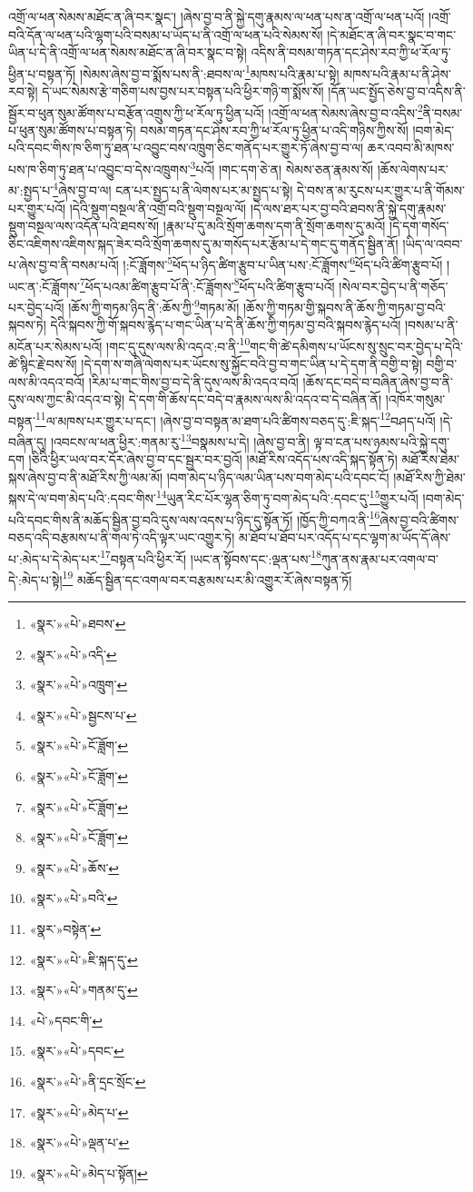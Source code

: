 འགྲོ་ལ་ཕན་སེམས་མཐོང་ན་ཞི་བར་སྣང་། །ཞེས་བྱ་བ་ནི་སྐྱེ་དགུ་རྣམས་ལ་ཕན་པས་ན་འགྲོ་ལ་ཕན་པའོ། །འགྲོ་བའི་དོན་ལ་ཕན་པའི་ལྷག་པའི་བསམ་པ་ཡོད་པ་ནི་འགྲོ་ལ་ཕན་པའི་སེམས་སོ། །དེ་མཐོང་ན་ཞི་བར་སྣང་བ་གང་ཡིན་པ་དེ་ནི་འགྲོ་ལ་ཕན་སེམས་མཐོང་ན་ཞི་བར་སྣང་བ་སྟེ། འདིས་ནི་བསམ་གཏན་དང་ཤེས་རབ་ཀྱི་ཕ་རོལ་ཏུ་ཕྱིན་པ་བསྟན་ཏོ། །སེམས་ཞེས་བྱ་བ་སྨོས་པས་ནི་:ཐབས་ལ་\footnote{«སྣར་»«པེ་»ཐབས་}མཁས་པའི་རྣམ་པ་སྟེ། མཁས་པའི་རྣམ་པ་ནི་ཤེས་རབ་སྟེ། དེ་ཡང་སེམས་རྩེ་གཅིག་པས་བྱས་པར་བསྟན་པའི་ཕྱིར་གཉི་ག་སྨོས་སོ། །དོན་ཡང་སྤྱོད་ཅེས་བྱ་བ་འདིས་ནི་སྦྱོར་བ་ཕུན་སུམ་ཚོགས་པ་བརྩོན་འགྲུས་ཀྱི་ཕ་རོལ་ཏུ་ཕྱིན་པའོ། །འགྲོ་ལ་ཕན་སེམས་ཞེས་བྱ་བ་འདིས་\footnote{«སྣར་»«པེ་»འདི་}ནི་བསམ་པ་ཕུན་སུམ་ཚོགས་པ་བསྟན་ཏེ། བསམ་གཏན་དང་ཤེས་རབ་ཀྱི་ཕ་རོལ་ཏུ་ཕྱིན་པ་འདི་གཉིས་ཀྱིས་སོ། །བག་མེད་པའི་དབང་གིས་ཁ་ཅིག་ཏུ་ཐན་པ་འབྱུང་བས་འཁྲུག་ཅིང་གནོད་པར་གྱུར་ཏོ་ཞེས་བྱ་བ་ལ། ཆར་འབབ་མི་མཁས་པས་ཁ་ཅིག་ཏུ་ཐན་པ་འབྱུང་བ་དེས་འཁྲུགས་\footnote{«སྣར་»«པེ་»འཁྲུག་}པའོ། །གང་དག་ཅེ་ན། སེམས་ཅན་རྣམས་སོ། །ཆོས་ལེགས་པར་མ་:སྤྱད་པ་\footnote{«སྣར་»«པེ་»སྦྱངས་པ་}ཞེས་བྱ་བ་ལ། ངན་པར་སྤྱད་པ་ནི་ལེགས་པར་མ་སྤྱད་པ་སྟེ། དེ་བས་ན་མ་རུངས་པར་གྱུར་པ་ནི་གོམས་པར་གྱུར་པའོ། །དེའི་སྡུག་བསྔལ་ནི་འགྲོ་བའི་སྡུག་བསྔལ་ལོ། །དེ་ལས་ཐར་པར་བྱ་བའི་ཐབས་ནི་སྐྱེ་དགུ་རྣམས་སྡུག་བསྔལ་ལས་འདོན་པའི་ཐབས་སོ། །རྣམ་པ་དུ་མའི་སྲོག་ཆགས་དག་ནི་སྲོག་ཆགས་དུ་མའོ། །དེ་དག་གསོད་ཅིང་འཇིགས་འཇིགས་སྐད་ཟེར་བའི་སྲོག་ཆགས་དུ་མ་གསོད་པར་རྩོམ་པ་དེ་གང་དུ་གནོད་སྦྱིན་ནོ། །ཡིད་ལ་འབབ་པ་ཞེས་བྱ་བ་ནི་བསམ་པའོ། །:ངོ་ཟློགས་\footnote{«སྣར་»«པེ་»ངོ་ཟློག་}ཕོད་པ་ཉིད་ཚིག་རྩུབ་པ་ཡིན་པས་:ངོ་ཟློགས་\footnote{«སྣར་»«པེ་»ངོ་ཟློག་}ཕོད་པའི་ཚིག་རྩུབ་པོ། །ཡང་ན་:ངོ་ཟློགས་\footnote{«སྣར་»«པེ་»ངོ་ཟློག་}ཕོད་པའམ་ཚིག་རྩུབ་པོ་ནི་:ངོ་ཟློགས་\footnote{«སྣར་»«པེ་»ངོ་ཟློག་}ཕོད་པའི་ཚིག་རྩུབ་པའོ། །སེལ་བར་བྱེད་པ་ནི་གཅོད་པར་བྱེད་པའོ། །ཆོས་ཀྱི་གཏམ་ཉིད་ནི་:ཆོས་ཀྱི་\footnote{«སྣར་»«པེ་»ཆོས་}གཏམ་མོ། །ཆོས་ཀྱི་གཏམ་གྱི་སྐབས་ནི་ཆོས་ཀྱི་གཏམ་བྱ་བའི་སྐབས་ཏེ། དེའི་སྐབས་ཀྱི་གོ་སྐབས་རྙེད་པ་གང་ཡིན་པ་དེ་ནི་ཆོས་ཀྱི་གཏམ་བྱ་བའི་སྐབས་རྙེད་པའོ། །བསམ་པ་ནི་མངོན་པར་སེམས་པའོ། །གང་དུ་དུས་ལས་མི་འདའ་:བ་ནི་\footnote{«སྣར་»«པེ་»བའི་}གང་གི་ཚེ་དམིགས་པ་ཡོངས་སུ་སྲུང་བར་བྱེད་པ་དེའི་ཚེ་སྙིང་རྗེ་བས་སོ། །དེ་དག་ས་གཞི་ལེགས་པར་ཡོངས་སུ་སྐྱོང་བའི་བྱ་བ་གང་ཡིན་པ་དེ་དག་ནི་བགྱི་བ་སྟེ། བགྱི་བ་ལས་མི་འདའ་བའོ། །རིམ་པ་གང་གིས་བྱ་བ་དེ་ནི་དུས་ལས་མི་འདའ་བའོ། །ཆོས་དང་བདེ་བ་བཞིན་ཞེས་བྱ་བ་ནི་དུས་ལས་ཀྱང་མི་འདའ་བ་སྟེ། དེ་དག་གི་ཆོས་དང་བདེ་བ་རྣམས་ལས་མི་འདའ་བ་དེ་བཞིན་ནོ། །འཁོར་གསུམ་བསྟན་\footnote{«སྣར་»བསྟེན་}ལ་མཁས་པར་གྱུར་པ་དང་། །ཞེས་བྱ་བ་བསྟན་མ་ཐག་པའི་ཚིགས་བཅད་དུ་:ཇི་སྐད་\footnote{«སྣར་»«པེ་»ཇི་སྐད་དུ་}བཤད་པའོ། །དེ་བཞིན་དུ། །འབངས་ལ་ཕན་ཕྱིར་:གནམ་རུ་\footnote{«སྣར་»«པེ་»གནམ་དུ་}བསྣམས་པ་དེ། །ཞེས་བྱ་བ་ནི། ལྟ་བ་ངན་པས་ཉམས་པའི་སྐྱེ་དགུ་དག །ཅིའི་ཕྱིར་ཡལ་བར་དོར་ཞེས་བྱ་བ་དང་སྦྱར་བར་བྱའོ། །མཐོ་རིས་འདོད་པས་འདི་སྐད་སྟོན་ཏེ། མཐོ་རིས་ཐེམ་སྐས་ཞེས་བྱ་བ་ནི་མཐོ་རིས་ཀྱི་ལམ་མོ། །བག་མེད་པ་ཉིད་ལམ་ཡིན་པས་བག་མེད་པའི་དབང་ངོ། །མཐོ་རིས་ཀྱི་ཐེམ་སྐས་དེ་ལ་བག་མེད་པའི་:དབང་གིས་\footnote{«པེ་»དབང་གི་}ཡུན་རིང་པོར་ལྷན་ཅིག་ཏུ་བག་མེད་པའི་:དབང་དུ་\footnote{«སྣར་»«པེ་»དབང་}གྱུར་པའོ། །བག་མེད་པའི་དབང་གིས་ནི་མཆོད་སྦྱིན་བྱ་བའི་དུས་ལས་འདས་པ་ཉིད་དུ་སྟོན་ཏོ། །ཁྱོད་ཀྱི་བཀའ་ནི་\footnote{«སྣར་»«པེ་»ནི་དྲང་སྲོང་}ཞེས་བྱ་བའི་ཚིགས་བཅད་འདི་བརྩམས་པ་ནི་གལ་ཏེ་འདི་ལྟར་ཡང་འགྱུར་ཏེ། མ་ཐོབ་པ་ཐོབ་པར་འདོད་པ་དང་ལྷག་མ་ཡོད་དོ་ཞེས་པ་:མེད་པ་དེ་མེད་པར་\footnote{«སྣར་»«པེ་»མེད་པ་}བསྟན་པའི་ཕྱིར་རོ། །ཡང་ན་སྟོབས་དང་:ལྡན་པས་\footnote{«སྣར་»«པེ་»ལྡན་པ་}ཀུན་ནས་རྣམ་པར་འགལ་བ་དེ་:མེད་པ་སྟེ།\footnote{«སྣར་»«པེ་»མེད་པ་སྟོན།} མཆོད་སྦྱིན་དང་འགལ་བར་བརྩམས་པར་མི་འགྱུར་རོ་ཞེས་བསྟན་ཏོ། 